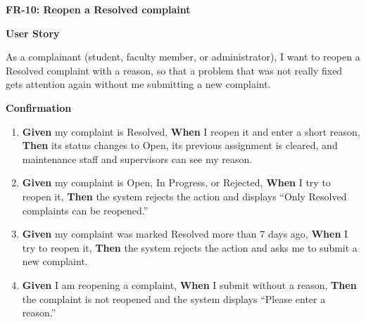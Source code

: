 \noindent\textbf{FR-10: Reopen a Resolved complaint}\par\nopagebreak[4]\smallskip
\noindent\textbf{User Story}\par\nopagebreak[4]
\noindent As a complainant (student, faculty member, or administrator), I want to reopen a Resolved complaint with a reason, so that a problem that was not really fixed gets attention again without me submitting a new complaint.\par\smallskip
{\makeatletter
{}
\makeatother
\noindent\textbf{Confirmation}\par\nopagebreak[4]\vspace{-6pt}\nopagebreak[4]
\begin{enumerate}\setlength{\itemsep}{2pt}\setlength{\parsep}{0pt}\setlength{\topsep}{2pt}\setlength{\partopsep}{0pt}
  \item \textbf{Given} my complaint is Resolved, \textbf{When} I reopen it and enter a short reason, \textbf{Then} its status changes to Open, its previous assignment is cleared, and maintenance staff and supervisors can see my reason.
  \item \textbf{Given} my complaint is Open, In Progress, or Rejected, \textbf{When} I try to reopen it, \textbf{Then} the system rejects the action and displays ``Only Resolved complaints can be reopened.''
  \item \textbf{Given} my complaint was marked Resolved more than 7 days ago, \textbf{When} I try to reopen it, \textbf{Then} the system rejects the action and asks me to submit a new complaint.
  \item \textbf{Given} I am reopening a complaint, \textbf{When} I submit without a reason, \textbf{Then} the complaint is not reopened and the system displays ``Please enter a reason.''
\end{enumerate}}
\medskip
 
